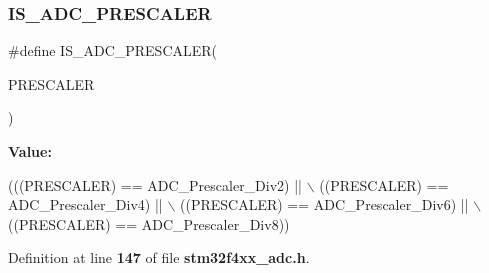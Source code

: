 \subsubsection{I\+S\+\_\+\+A\+D\+C\+\_\+\+P\+R\+E\+S\+C\+A\+L\+ER}
{\footnotesize\ttfamily \#define I\+S\+\_\+\+A\+D\+C\+\_\+\+P\+R\+E\+S\+C\+A\+L\+ER(\begin{DoxyParamCaption}\item[{}]{P\+R\+E\+S\+C\+A\+L\+ER }\end{DoxyParamCaption})}

{\bfseries Value\+:}
\begin{DoxyCode}
(((PRESCALER) == ADC_Prescaler_Div2) || \(\backslash\)
                                     ((PRESCALER) == ADC_Prescaler_Div4) || \(\backslash\)
                                     ((PRESCALER) == ADC_Prescaler_Div6) || \(\backslash\)
                                     ((PRESCALER) == ADC_Prescaler_Div8))
\end{DoxyCode}


Definition at line \textbf{ 147} of file \textbf{ stm32f4xx\+\_\+adc.\+h}.

